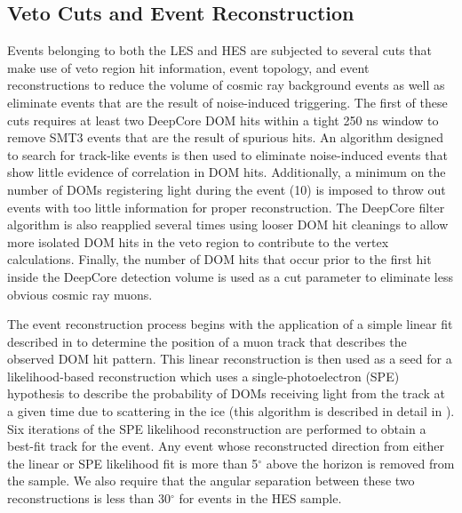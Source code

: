 \documentclass[manuscript]{aastex}
\begin{document}
\subsection{Veto Cuts and Event Reconstruction}
Events belonging to both the LES and HES are subjected to several cuts that make use of veto region hit information, event topology, and event reconstructions to reduce the volume of cosmic ray background events as well as eliminate events that are the result of noise-induced triggering. The first of these cuts requires at least two DeepCore DOM hits within a tight 250 ns window to remove SMT3 events that are the result of spurious hits. An algorithm designed to search for track-like events is then used to eliminate noise-induced events that show little evidence of correlation in DOM hits. Additionally, a minimum on the number of DOMs registering light during the event (10) is imposed to throw out events with too little information for proper reconstruction. The DeepCore filter algorithm is also reapplied several times using looser DOM hit cleanings to allow more isolated DOM hits in the veto region to contribute to the vertex calculations. Finally, the number of DOM hits that occur prior to the first hit inside the DeepCore detection volume is used as a cut parameter to eliminate less obvious cosmic ray muons.

The event reconstruction process begins with the application of a simple linear fit described in \cite{2014NIMPA.736..143A} to determine the position of a muon track that describes the observed DOM hit pattern. This linear reconstruction is then used as a seed for a likelihood-based reconstruction which uses a single-photoelectron (SPE) hypothesis to describe the probability of DOMs receiving light from the track at a given time due to scattering in the ice (this algorithm is described in detail in \cite{2004NIMPA.524..169A}). Six iterations of the SPE likelihood reconstruction are performed to obtain a best-fit track for the event. Any event whose reconstructed direction from either the linear or SPE likelihood fit is more than 5$^{\circ}$ above the horizon is removed from the sample. We also require that the angular separation between these two reconstructions is less than 30$^{\circ}$ for events in the HES sample.
\end{document}
